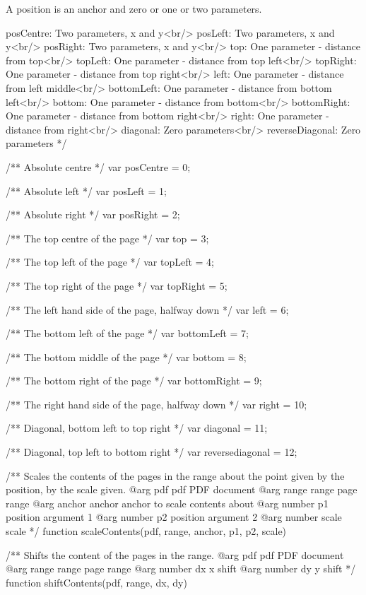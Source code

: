 A position is an anchor and zero or one or two parameters.

posCentre: Two parameters, x and y<br/>
posLeft: Two parameters, x and y<br/>
posRight: Two parameters, x and y<br/>
top: One parameter - distance from top<br/>
topLeft: One parameter - distance from top left<br/>
topRight: One parameter - distance from top right<br/>
left: One parameter - distance from left middle<br/>
bottomLeft: One parameter - distance from bottom left<br/>
bottom: One parameter - distance from bottom<br/>
bottomRight: One parameter - distance from bottom right<br/>
right: One parameter - distance from right<br/>
diagonal: Zero parameters<br/>
reverseDiagonal: Zero parameters */

/** Absolute centre */
var posCentre = 0;

/** Absolute left */
var posLeft = 1;

/** Absolute right */
var posRight = 2;

/** The top centre of the page */
var top = 3;

/** The top left of the page */
var topLeft = 4;

/** The top right of the page */
var topRight = 5;

/** The left hand side of the page, halfway down */
var left = 6;

/** The bottom left of the page */
var bottomLeft = 7;

/** The bottom middle of the page */
var bottom = 8;

/** The bottom right of the page */
var bottomRight = 9;

/** The right hand side of the page, halfway down */
var right = 10;

/** Diagonal, bottom left to top right */
var diagonal = 11;

/** Diagonal, top left to bottom right */
var reversediagonal = 12;

/** Scales the contents of the pages in the range about the point given by
the position, by the scale given.
@arg {pdf} pdf PDF document
@arg {range} range page range
@arg {anchor} anchor anchor to scale contents about
@arg {number} p1 position argument 1
@arg {number} p2 position argument 2
@arg {number} scale scale */
function scaleContents(pdf, range, anchor, p1, p2, scale) {}

/** Shifts the content of the pages in the range.
@arg {pdf} pdf PDF document
@arg {range} range page range
@arg {number} dx x shift
@arg {number} dy y shift */
function shiftContents(pdf, range, dx, dy) {}


